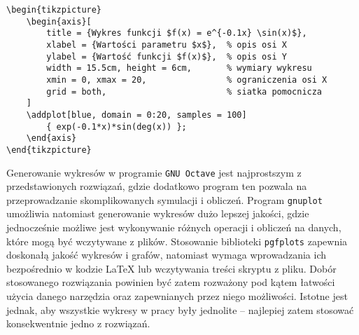 \begin{listing}[ht!]
\begin{verbatim}
\begin{tikzpicture}
	\begin{axis}[
		title = {Wykres funkcji $f(x) = e^{-0.1x} \sin(x)$},
		xlabel = {Wartości parametru $x$},  % opis osi X
		ylabel = {Wartość funkcji $f(x)$},  % opis osi Y
		width = 15.5cm, height = 6cm,       % wymiary wykresu
		xmin = 0, xmax = 20,                % ograniczenia osi X
		grid = both,                        % siatka pomocnicza
	]
	\addplot[blue, domain = 0:20, samples = 100]
		{ exp(-0.1*x)*sin(deg(x)) };
	\end{axis}
\end{tikzpicture}
\end{verbatim}
\end{listing}

Generowanie wykresów w programie \texttt{GNU Octave} jest najprostszym z przedstawionych rozwiązań, gdzie dodatkowo program ten pozwala na przeprowadzanie skomplikowanych symulacji i obliczeń. Program \texttt{gnuplot} umożliwia natomiast generowanie wykresów dużo lepszej jakości, gdzie jednocześnie możliwe jest wykonywanie różnych operacji i obliczeń na danych, które mogą być wczytywane z plików. Stosowanie biblioteki \texttt{pgfplots} zapewnia doskonałą jakość wykresów i grafów, natomiast wymaga wprowadzania ich bezpośrednio w kodzie \LaTeX{} lub wczytywania treści skryptu z pliku. Dobór stosowanego rozwiązania powinien być zatem rozważony pod kątem łatwości użycia danego narzędzia oraz zapewnianych przez niego możliwości. Istotne jest jednak, aby wszystkie wykresy w pracy były jednolite -- najlepiej zatem stosować konsekwentnie jedno z rozwiązań.
